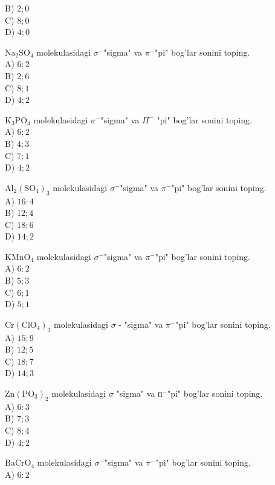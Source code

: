 B) $2 ; 0$\\
C) $8 ; 0$\\
D) $4 ; 0$
  \item $\mathrm{Na}_{2} \mathrm{SO}_{4}$ molekulasidagi $\sigma^{-}$"sigma" va $\pi^{-}$"pi" bog'lar sonini toping.\\
A) $6 ; 2$\\
B) $2 ; 6$\\
C) $8 ; 1$\\
D) $4 ; 2$\\
  \item $\mathrm{K}_{3} \mathrm{PO}_{4}$ molekulasidagi $\sigma^{-}$"sigma" va $\Pi^{-}$ "pi" bog'lar sonini toping.\\
A) $6 ; 2$\\
B) $4 ; 3$\\
C) $7 ; 1$\\
D) $4 ; 2$
  \item $\mathrm{Al}_{2}\left(\mathrm{SO}_{4}\right)_{3}$ molekulasidagi $\sigma^{-}$"sigma" va $\pi^{-}$"pi" bog'lar sonini toping.\\
A) $16: 4$\\
B) $12 ; 4$\\
C) $18 ; 6$\\
D) $14 ; 2$
  \item $\mathrm{KMnO}_{4}$ molekulasidagi $\sigma^{-}$"sigma" va $\pi^{-}$"pi" bog'lar sonini toping.\\
A) $6: 2$\\
B) $5 ; 3$\\
C) $6 ; 1$\\
D) $5 ; 1$
  \item $\mathrm{Cr}\left(\mathrm{ClO}_{4}\right)_{3}$ molekulasidagi $\sigma$ - "sigma" va $\pi^{-}$"pi" bog'lar sonini toping.\\
A) $15 ; 9$\\
B) $12 ; 5$\\
C) $18 ; 7$\\
D) $14 ; 3$
  \item $\mathrm{Zn}\left(\mathrm{PO}_{3}\right)_{2}$ molekulasidagi $\sigma$ "sigma" va $п^{-}$"pi" bog'lar sonini toping.\\
A) $6: 3$\\
B) $7 ; 3$\\
C) $8 ; 4$\\
D) $4 ; 2$
  \item $\mathrm{BaCrO}_{4}$ molekulasidagi $\sigma^{-}$"sigma" va $\pi^{-}$"pi" bog'lar sonini toping.\\
A) $6: 2$\\
